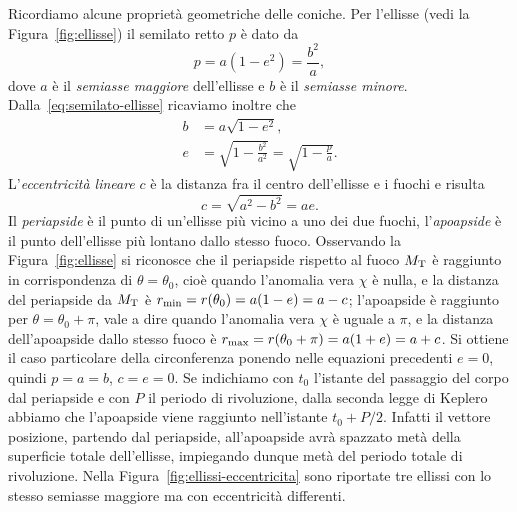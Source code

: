 Ricordiamo alcune proprietà geometriche delle coniche. Per l'ellisse (vedi la
Figura~\ref{fig:ellisse}) il semilato retto $p$ è dato da
\begin{equation}
  \label{eq:semilato-ellisse}
  p = a(1-e^2) = \frac{b^2}{a},
\end{equation}
dove $a$ è il \emph{semiasse maggiore} dell'ellisse e $b$ è il \emph{semiasse
  minore}. Dalla~\eqref{eq:semilato-ellisse} ricaviamo inoltre che
\begin{align}
  b &= a\sqrt{1-e^2}, \label{eq:semiasse-minore-ellisse}\\
  e &= \sqrt{1-\frac{b^2}{a^2}} =
  \sqrt{1-\frac{p}{a}}. \label{eq:eccentricita-ellisse}
\end{align}
L'\emph{eccentricità lineare} $c$ è la distanza fra il centro dell'ellisse e i
fuochi e risulta
\begin{equation}
  c=\sqrt{a^2-b^2} = ae.
\end{equation}
Il \emph{periapside} è il punto di un'ellisse più vicino a uno dei due fuochi,
l'\emph{apoapside} è il punto dell'ellisse più lontano dallo stesso
fuoco. Osservando la Figura~\ref{fig:ellisse} si riconosce che il periapside
rispetto al fuoco $M_\textup{T}$ è raggiunto in corrispondenza di
$\theta=\theta_0$, cioè quando l'anomalia vera $\chi$ è nulla, e la distanza del
periapside da $M_\textup{T}$ è $r_\textup{min} = r(\theta_0) = a(1-e) = a-c$;
l'apoapside è raggiunto per $\theta=\theta_0+\pi$, vale a dire quando l'anomalia
vera $\chi$ è uguale a $\pi$, e la distanza dell'apoapside dallo stesso fuoco è
$r_\textup{max} = r(\theta_0+\pi) = a(1+e)= a+c$. Si ottiene il caso particolare
della circonferenza ponendo nelle equazioni precedenti $e=0$, quindi $p=a=b$,
$c=e=0$. Se indichiamo con $t_0$ l'istante del passaggio del corpo dal
periapside e con $P$ il periodo di rivoluzione, dalla seconda legge di Keplero
abbiamo che l'apoapside viene raggiunto nell'istante $t_0 + P/2$. Infatti il
vettore posizione, partendo dal periapside, all'apoapside avrà spazzato metà
della superficie totale dell'ellisse, impiegando dunque metà del periodo totale
di rivoluzione. Nella Figura~\ref{fig:ellissi-eccentricita} sono riportate tre
ellissi con lo stesso semiasse maggiore ma con eccentricità differenti.
